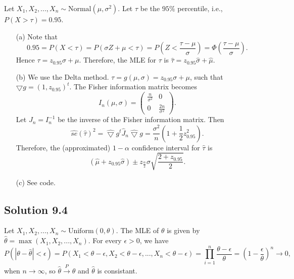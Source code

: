 Let $X_1, X_2, ..., X_n \sim \mathrm{Normal}(\mu, \sigma^2)$.
Let $\tau$ be the $95\%$ percentile, i.e., $P(X > \tau) = 0.95$.
\begin{itemize}
    \item[(a)] Note that
        \begin{equation*}
            0.95
                = P(X < \tau)
                = P(\sigma Z + \mu < \tau)
                = P\left(Z < \frac{\tau - \mu}{\sigma}\right)
                = \Phi\left(\frac{\tau - \mu}{\sigma}\right).
        \end{equation*}
        Hence $\tau = z_{0.95} \sigma + \mu$.
        Therefore, the MLE for $\tau$ is $\hat{\tau} = z_{0.95} \hat{\sigma} + \hat{\mu}$.
    \item[(b)] We use the Delta method.
        $\tau = g(\mu, \sigma) = z_{0.95} \sigma + \mu$, such that $\bigtriangledown g = (1, z_{0.95})^t$.
        The Fisher information matrix becomes
        \begin{equation*}
            I_n(\mu, \sigma) = \left( \begin{matrix}
                \frac{n}{\sigma^2} & 0 \\
                0 & \frac{2n}{\sigma^2}
            \end{matrix} \right).
        \end{equation*}
        Let $J_n = I_n^{-1}$ be the inverse of the Fisher information matrix.
        Then
        \begin{equation*}
            \hat{se}(\hat{\tau})^2
                = \hat{\bigtriangledown} g^t \hat{J}_n \hat{\bigtriangledown} g
                = \frac{\sigma^2}{n}\left(1 + \frac{1}{2} z_{0.95}^2\right).
        \end{equation*}
        Therefore, the (approximated) $1 - \alpha$ confidence interval for $\hat{\tau}$ is
        \begin{equation*}
            (\hat{\mu} + z_{0.95}\hat{\sigma}) \pm z_{\frac{\alpha}{2}} \sigma \sqrt{\frac{2 + z_{0.95}}{2}}.
        \end{equation*}
    \item[(c)] See code.
\end{itemize}


\subsection*{Solution 9.4}

Let $X_1, X_2, ..., X_n \sim \mathrm{Uniform}(0, \theta)$.
The MLE of $\theta$ is given by $\hat{\theta} = \max(X_1, X_2, ..., X_n)$.
For every $\epsilon > 0$, we have
\begin{equation*}
    P(|\theta - \hat{\theta}| < \epsilon)
        = P(X_1 < \theta - \epsilon, X_2 < \theta - \epsilon, ..., X_n < \theta - \epsilon)
        = \prod_{i = 1}^n \frac{\theta - \epsilon}{\theta}
        = \left(1 - \frac{\epsilon}{\theta}\right)^n
        \to 0,
\end{equation*}
when $n \to \infty$, so $\hat{\theta} \xrightarrow{P} \theta$ and $\hat{\theta}$ is consistant.


